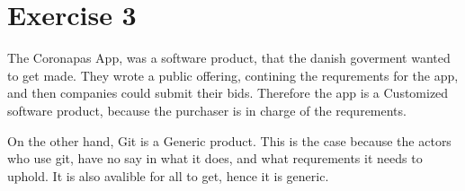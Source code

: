\section{Exercise 3}
The Coronapas App, was a software product, that the danish goverment wanted to get made.
They wrote a public offering, contining the requrements for the app, and then companies could submit their bids.
Therefore the app is a Customized software product, because the purchaser is in charge of the requrements. 

On the other hand, Git is a Generic product.
This is the case because the actors who use git, have no say in what it does, and what requrements it needs to uphold.
It is also avalible for all to get, hence it is generic.




